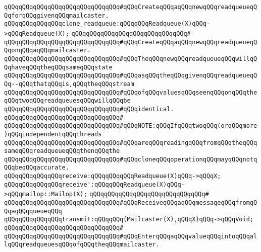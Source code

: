 \verb|qQQqqQQqqQQqqQQqqQQqqQQqqQQqqQQq#qQQqCreateqQQqaqQQqnewqQQqreadqueueqQQqforqQQqgivenqQQqmailcaster.|\newline
\newline
\verb|qQQqqQQqqQQqqQQqclone_readqueue:qQQqqQQqReadqueue(X)qQQq->qQQqReadqueue(X);|\newline
\verb|qQQqqQQqqQQqqQQqqQQqqQQqqQQqqQQq#|\newline
\verb|qQQqqQQqqQQqqQQqqQQqqQQqqQQqqQQq#qQQqCreateqQQqaqQQqnewqQQqreadqueueqQQqonqQQqaqQQqmailcaster.|\newline
\verb|qQQqqQQqqQQqqQQqqQQqqQQqqQQqqQQq#qQQqTheqQQqnewqQQqreadqueueqQQqwillqQQqhaveqQQqtheqQQqsameqQQqstate|\newline
\verb|qQQqqQQqqQQqqQQqqQQqqQQqqQQqqQQq#qQQqasqQQqtheqQQqgivenqQQqreadqueueqQQq--qQQqthatqQQqis,qQQqtheqQQqstream|\newline
\verb|qQQqqQQqqQQqqQQqqQQqqQQqqQQqqQQq#qQQqofqQQqvaluesqQQqseenqQQqonqQQqtheqQQqtwoqQQqreadqueuesqQQqwillqQQqbe|\newline
\verb|qQQqqQQqqQQqqQQqqQQqqQQqqQQqqQQq#qQQqidentical.|\newline
\verb|qQQqqQQqqQQqqQQqqQQqqQQqqQQqqQQq#|\newline
\verb|qQQqqQQqqQQqqQQqqQQqqQQqqQQqqQQq#qQQqNOTE:qQQqIfqQQqtwoqQQq(orqQQqmore)qQQqindependentqQQqthreads|\newline
\verb|qQQqqQQqqQQqqQQqqQQqqQQqqQQqqQQq#qQQqareqQQqreadingqQQqfromqQQqtheqQQqsameqQQqreadqueueqQQqthenqQQqthe|\newline
\verb|qQQqqQQqqQQqqQQqqQQqqQQqqQQqqQQq#qQQqcloneqQQqoperationqQQqmayqQQqnotqQQqbeqQQqaccurate.|\newline
\newline
\verb|qQQqqQQqqQQqqQQqreceive:qQQqqQQqqQQqReadqueue(X)qQQq->qQQqX;|\newline
\verb|qQQqqQQqqQQqqQQqreceive':qQQqqQQqReadqueue(X)qQQq->qQQqmailop::Mailop(X);|\newline
\verb|qQQqqQQqqQQqqQQqqQQqqQQqqQQqqQQq#|\newline
\verb|qQQqqQQqqQQqqQQqqQQqqQQqqQQqqQQq#qQQqReceiveqQQqaqQQqmessageqQQqfromqQQqaqQQqqueueqQQq|\newline
\newline
\verb|qQQqqQQqqQQqqQQqtransmit:qQQqqQQq(Mailcaster(X),qQQqX)qQQq->qQQqVoid;|\newline
\verb|qQQqqQQqqQQqqQQqqQQqqQQqqQQqqQQq#|\newline
\verb|qQQqqQQqqQQqqQQqqQQqqQQqqQQqqQQq#qQQqEnterqQQqaqQQqvalueqQQqintoqQQqallqQQqreadqueuesqQQqofqQQqtheqQQqmailcaster.|\newline
